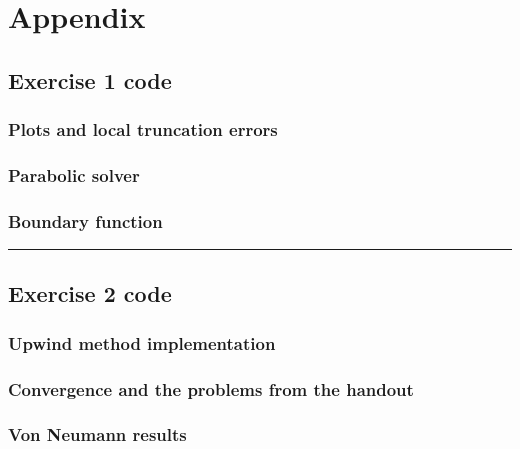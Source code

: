 \documentclass[12pt, a4paper, titlepage]{article} %
\begin{document}
% 

%


\tableofcontents
\newpage






% 

\clearpage
\appendix
\section{Appendix}
\subsection{Exercise 1 code}
%
\subsubsection{Plots and local truncation errors}

%
\subsubsection{Parabolic solver}

\subsubsection{Boundary function}


\textcolor[RGB]{20,20,20}{\rule{\linewidth}{0.5pt}}
\subsection{Exercise 2 code}
%
\subsubsection{Upwind method implementation}

%
\subsubsection{Convergence and the problems from the handout}

%
\subsubsection{Von Neumann results}

\end{document}

